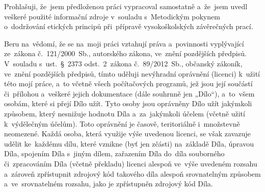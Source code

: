 \documentclass[czech,bachelor,unicode]{ctufit-thesis}
\theoremstyle{plain}
\theoremstyle{definition}
\theoremstyle{remark}
\numberwithin{theorem}{chapter}
\begin{document}
\begin{declarationpage}
Prohlašuji, že~jsem předloženou práci vypracoval samostatně a~že~jsem uvedl veškeré použité informační zdroje v~souladu s~Metodickým pokynem o~dodržování etických principů při~přípravě vysokoškolských závěrečných prací.

Beru na~vědomí, že se na~moji práci vztahují práva a~povinnosti vyplývající ze~zákona č.~121/2000~Sb., autorského zákona, ve~znění pozdějších předpisů. V~souladu s~ust.~§~2373 odst.~2~zákona č.~89/2012~Sb., občanský zákoník, ve~znění pozdějších předpisů, tímto uděluji nevýhradní oprávnění (licenci) k~užití této mojí práce, a~to včetně všech počítačových programů, jež jsou její součástí či~přílohou a~veškeré jejich dokumentace (dále souhrnně jen „Dílo“), a~to~všem osobám, které si přejí Dílo užít. Tyto osoby jsou oprávněny Dílo užít jakýmkoli způsobem, který nesnižuje hodnotu Díla a~za~jakýmkoli účelem (včetně užití k~výdělečným účelům). Toto oprávnění je časově, teritoriálně i~množstevně neomezené. Každá osoba, která využije výše uvedenou licenci, se však zavazuje udělit ke~každému dílu, které vznikne (byť jen zčásti) na~základě Díla, úpravou Díla, spojením Díla s~jiným dílem, zařazením Díla do~díla souborného či~zpracováním Díla (včetně překladu) licenci alespoň ve~výše uvedeném rozsahu a~zároveň zpřístupnit zdrojový kód takového díla alespoň srovnatelným způsobem a~ve~srovnatelném rozsahu, jako je zpřístupněn zdrojový kód Díla.
\end{declarationpage}

\printabstractpage %
\end{document}
